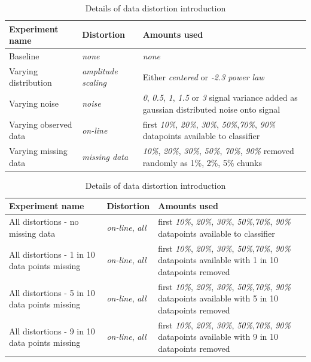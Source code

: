 \documentclass[10pt]{report}
\begin{document}
	\begin{table}[ht!]
		\label{tab:experiments}
		\centering
		\begin{tabular}{|p{}|l|p{}|} \hline
			\textbf{Experiment name} & \textbf{Distortion} & \textbf{Amounts used} \\ \hline
			Baseline & \emph{none} & \emph{none} \\
			Varying distribution & \emph{amplitude scaling} & Either \emph{centered} or \emph{-2.3 power law} \\
			Varying noise & \emph{noise} & \emph{0}, \emph{0.5}, \emph{1}, \emph{1.5} or \emph{3} signal variance added as gaussian distributed noise onto signal\\
			Varying observed data & \emph{on-line} & first \emph{10\%}, \emph{20\%}, \emph{30\%}, \emph{50\%},\emph{70\%}, \emph{90\%} datapoints available to classifier \\
			Varying missing data & \emph{missing data} & \emph{10\%}, \emph{20\%}, \emph{30\%}, \emph{50\%}, \emph{70\%}, \emph{90\%} removed randomly as 1\%, 2\%, 5\% chunks \\ \hline
		\end{tabular}
		\caption{Details of data distortion introduction}
	\end{table}
	
		\begin{table}[ht!]
		\label{tab:experiments}
		\centering
		\begin{tabular}{|p{}|l|p{}|} \hline
			\textbf{Experiment name} & \textbf{Distortion} & \textbf{Amounts used} \\ \hline
			All distortions - no missing data & \emph{on-line}, \emph{all} & first \emph{10\%}, \emph{20\%}, \emph{30\%}, \emph{50\%},\emph{70\%}, \emph{90\%} datapoints available to classifier \\ \hline
			All distortions - 1 in 10 data points missing & \emph{on-line}, \emph{all} & first \emph{10\%}, \emph{20\%}, \emph{30\%}, \emph{50\%},\emph{70\%}, \emph{90\%} datapoints available with 1 in 10 datapoints removed \\ \hline
			All distortions - 5 in 10 data points missing & \emph{on-line}, \emph{all} & first \emph{10\%}, \emph{20\%}, \emph{30\%}, \emph{50\%},\emph{70\%}, \emph{90\%} datapoints available with 5 in 10 datapoints removed \\ \hline
			All distortions - 9 in 10 data points missing & \emph{on-line}, \emph{all} & first \emph{10\%}, \emph{20\%}, \emph{30\%}, \emph{50\%},\emph{70\%}, \emph{90\%} datapoints available with 9 in 10 datapoints removed \\ \hline
		\end{tabular}
		\caption{Details of data distortion introduction}
	\end{table}
	
\end{document}
